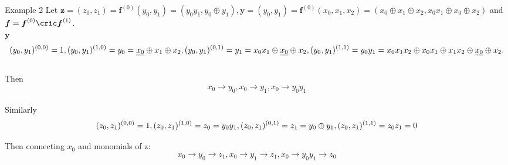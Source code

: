 \documentclass[notheorems,aspectratio=169]{beamer}
\begin{document}
\begin{frame}
    \begin{block}{Example 2}
        Let $\boldsymbol{z}=(z_0,z_1)=\boldsymbol{f}^{(0)}(y_0,y_1)=(y_0y_1,y_0 \oplus y_1),\boldsymbol{y}=(y_0,y_1)=
        \boldsymbol{f}^{(0)}(x_0,x_1,x_2)=(x_0\oplus x_1 \oplus x_2 ,x_0x_1 \oplus x_0 \oplus x_2)$ and 
        $ \boldsymbol{f}=\boldsymbol{f}^{(0)} \cric \boldsymbol{f}^{(1)}$.
        \\


            
        $\boldsymbol{y}$
        $$
            (y_0,y_1)^{(0,0)}=1,(y_0,y_1)^{(1,0)}=y_0=\underline{x_0}\oplus x_1\oplus x_2,(y_0,y_1)^{(0,1)}=y_1=x_0x_1\oplus 
             \underline{x_0} \\ 
              \oplus x_2,\\
            (y_0,y_1)^{(1,1)}=y_0y_1=x_0x_1x_2 \oplus x_0x_1\oplus x_1x_2 \oplus \underline{x_0} \oplus x_2.
        $$
        \\Then $$ x_0 \rightarrow y_0,x_0\rightarrow y_1,x_0 \rightarrow y_0y_1$$
        \\Similarly $$ (z_0,z_1)^{(0,0)}=1,(z_0,z_1)^{(1,0)}=z_0=y_0y_1,(z_0,z_1)^{(0,1)}=z_1=y_0\oplus y_1,
         \\(z_0,z_1)^{(1,1)}=z_0z_1=0$$

         Then connecting $ x_0$ and monomials of z:$$ x_0 \rightarrow y_0 \rightarrow z_1,x_0 \rightarrow y_1 \rightarrow z_1,x_0 \rightarrow y_0y_1 \rightarrow z_0$$

    \end{block}
\end{frame}
\end{document}
